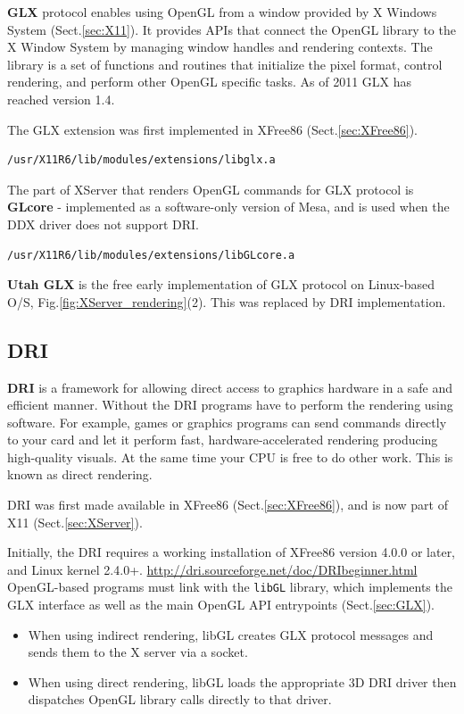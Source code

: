 {\bf GLX} protocol enables using OpenGL from a window provided by X Windows
System (Sect.\ref{sec:X11}). It provides APIs that connect the OpenGL library
to the X Window System by managing window handles and rendering contexts.
The library is a set of functions and routines that initialize the pixel format,
control rendering, and perform other OpenGL specific tasks.
As of 2011 GLX has reached version 1.4.

The GLX extension was first implemented in XFree86 (Sect.\ref{sec:XFree86}).
\begin{verbatim}
/usr/X11R6/lib/modules/extensions/libglx.a
\end{verbatim}
The part of XServer that renders OpenGL commands for GLX protocol is {\bf
GLcore} - implemented as a software-only version of Mesa, and is used when the
DDX driver does not support DRI. 
\begin{verbatim}
/usr/X11R6/lib/modules/extensions/libGLcore.a
\end{verbatim}
{\bf Utah GLX} is the free early implementation of GLX protocol on Linux-based
O/S, Fig.\ref{fig:XServer_rendering}(2). This was replaced by DRI
implementation.

\subsection{DRI}
\label{sec:DRI}

{\bf DRI} is a framework for allowing direct access to graphics hardware in a
safe and efficient manner.  Without the DRI programs have to perform the
rendering using software.
For example, games or graphics programs can send commands directly to your card
and let it perform fast, hardware-accelerated rendering producing high-quality
visuals. At the same time your CPU is free to do other work. This is known as
direct rendering.

DRI was first made available in XFree86 (Sect.\ref{sec:XFree86}), and is now
part of X11 (Sect.\ref{sec:XServer}).

Initially, the DRI requires a working installation of XFree86 version 4.0.0 or
later, and Linux kernel 2.4.0+. \url{http://dri.sourceforge.net/doc/DRIbeginner.html}
OpenGL-based programs must link with the \verb!libGL! library,
which implements the GLX interface as well as the main OpenGL API entrypoints
(Sect.\ref{sec:GLX}).
\begin{itemize}
  \item When using indirect rendering, libGL creates GLX protocol messages and
  sends them to the X server via a socket. 
  \item When using direct rendering, libGL loads the appropriate 3D DRI driver
  then dispatches OpenGL library calls directly to that driver.
\end{itemize}

